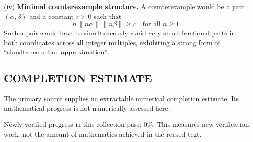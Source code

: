 (iv) \textbf{Minimal counterexample structure.} A counterexample would be a pair $(\alpha,\beta)$ and a constant $c>0$ such that
\[n\,\|n\alpha\|\,\|n\beta\|\ge c\quad\text{for all }n\ge 1.
\]
Such a pair would have to simultaneously avoid very small fractional parts in both coordinates across all integer multiples, exhibiting a strong form of ``simultaneous bad approximation''.


\subsection*{COMPLETION ESTIMATE}
The primary source supplies no extractable numerical completion estimate. Its mathematical progress is not numerically assessed here.

Newly verified progress in this collection pass: $0\%$. This measures new verification work, not the amount of mathematics achieved in the reused text.
